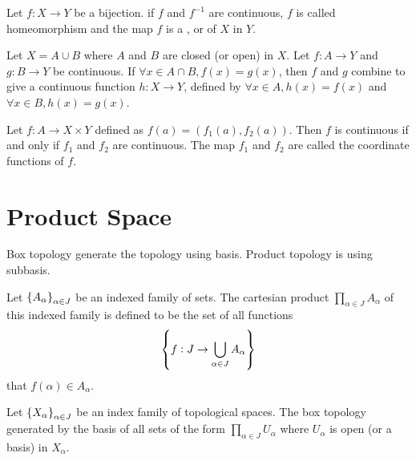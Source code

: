 \begin{definition}
    Let $f:X \rightarrow Y$ be a bijection. if $f$ and $f^{-1}$ are continuous, $f$ is called homeomorphism and the map $f$ is a , or  of $X$ in $Y$.
\end{definition}


\begin{theorem}
    Let $X = A \cup B$ where $A$ and $B$ are closed (or open) in $X$. Let $f: A \rightarrow Y$ and $g: B \rightarrow Y$ be continuous. If $\forall x \in A \cap B, f(x) = g(x)$, then $f$ and $g$ combine to give a continuous function $h: X \rightarrow Y$, defined by $\forall x \in A, h(x) = f(x) $ and $\forall x \in B , h(x) = g(x)$.
\end{theorem}

\begin{theorem}
Let $f: A \rightarrow X \times Y$ defined as $f(a) = \left(f_1(a), f_2(a) \right)$. Then $f$ is continuous if and only if $f_1$ and $f_2$ are continuous. The map $f_1$ and $f_2$ are called the coordinate functions of $f$.
\end{theorem}


\section{Product Space}

Box topology generate the topology using basis. Product topology is using subbasis.
    
\begin{definition}
    Let $\set{A_{\alpha}}_{\alpha \in J}$ be an indexed family of sets. The cartesian product $\displaystyle \prod_{\alpha \in J} A_{\alpha}$ of this indexed family is defined to be the set of all functions 
    \begin{equation}
        \set{f : J \rightarrow \bigcup_{\alpha \in J} A_{\alpha}}
    \end{equation}
    that $f(\alpha) \in A_{\alpha}$.
\end{definition}

\begin{definition}
    Let $\set{X_{\alpha}}_{\alpha \in J}$ be an index family of topological spaces. The box topology generated by the basis of all sets of the form $\displaystyle \prod_{\alpha \in J} U_{\alpha}$ where $U_{\alpha}$ is open (or a basis) in $X_{\alpha}$. 
\end{definition}

